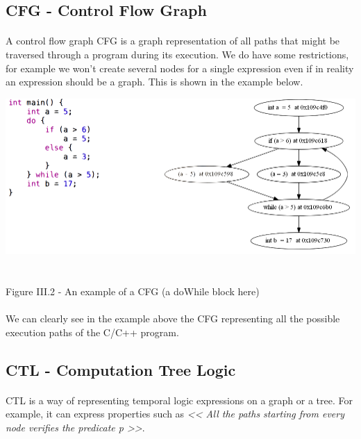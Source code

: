 \documentclass{report}
\begin{document}
\subsection{CFG - Control Flow Graph}

\paragraph{}
\hspace{4mm}A control flow graph \textsc{CFG} is a graph representation of 
all paths that might be traversed through a program during 
its execution. We do have some restrictions, 
for example we won't create several nodes for a single expression 
even if in reality an expression should be a graph. This is shown 
in the example below.

\begin{center}
\includegraphics[scale=0.8]{data/codeCFG.png}
~\\~\\Figure III.2 - An example of a CFG (a doWhile block here)
\end{center}

\paragraph{}
\hspace{4mm}We can clearly see in the example above the
CFG representing all the possible execution paths of the C/C++ program.

\subsection{CTL - Computation Tree Logic}

\paragraph{}
\hspace{4mm}CTL is a way of representing temporal logic expressions on a graph or a tree. For example, it can
express properties such as \textit{<< All the paths starting from every node verifies the predicate p >>}.
\end{document}
